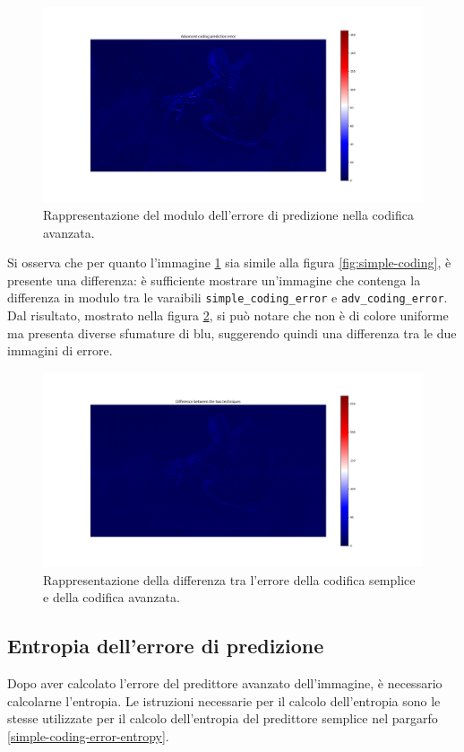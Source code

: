 \begin{figure}[h]
    \centering
    \includegraphics[width = .9\textwidth]{hw-1/report/imgs/advanced-coding.png}
    \caption{Rappresentazione del modulo dell'errore di predizione nella codifica avanzata.}
    \label{fig:advanced-coding}
\end{figure}

\FloatBarrier\noindent Si osserva che per quanto l'immagine \ref{fig:advanced-coding} sia simile alla figura \ref{fig:simple-coding}, è presente una differenza: è sufficiente mostrare un'immagine che contenga la differenza in modulo tra le varaibili \texttt{simple\_coding\_error} e \texttt{adv\_coding\_error}. Dal risultato, mostrato nella figura \ref{fig:error-difference}, si può notare che non è di colore uniforme ma presenta diverse sfumature di blu, suggerendo quindi una differenza tra le due immagini di errore.

\begin{figure}[h]
    \centering
    \includegraphics[width = .9\textwidth]{hw-1/report/imgs/error-difference.png}
    \caption{Rappresentazione della differenza tra l'errore della codifica semplice e della codifica avanzata.}
    \label{fig:error-difference}
\end{figure}



\vspace{15px}\subsection{Entropia dell'errore di predizione}
Dopo aver calcolato l'errore del predittore avanzato dell'immagine, è necessario calcolarne l'entropia. Le istruzioni necessarie per il calcolo dell'entropia sono le stesse utilizzate per il calcolo dell'entropia del predittore semplice nel pargarfo \ref{simple-coding-error-entropy}.



